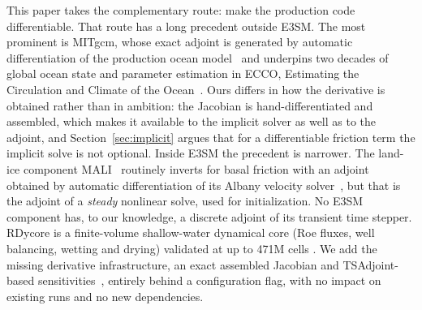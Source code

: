 \documentclass[11pt]{article}
\begin{document}
This paper takes the complementary route: make the production code
differentiable. That route has a long precedent outside E3SM. The most
prominent is MITgcm, whose exact adjoint is generated by automatic
differentiation of the production ocean model~\cite{heimbach2005mitgcm}
and underpins two decades of global ocean state and parameter
estimation in ECCO, Estimating the Circulation and Climate of the
Ocean~\cite{forget2015ecco}. Ours differs in how the derivative
is obtained rather than in ambition: the Jacobian is
hand-differentiated and assembled, which makes it available to the
implicit solver as well as to the adjoint, and
Section~\ref{sec:implicit} argues that for a differentiable friction
term the implicit solve is not optional. Inside E3SM the precedent is
narrower. The land-ice component MALI~\cite{hoffman2018mali} routinely
inverts for basal friction with an adjoint obtained by automatic
differentiation of its Albany velocity
solver~\cite{perego2014initialization}, but that is the adjoint of a
\emph{steady} nonlinear solve, used for initialization. No E3SM
component has, to our knowledge, a discrete adjoint of its transient
time stepper. RDycore is a finite-volume shallow-water dynamical core
(Roe fluxes, well balancing, wetting and drying) validated at up to
471M cells \cite{bisht2025development}. We add the missing
derivative infrastructure, an exact
assembled Jacobian and TSAdjoint-based
sensitivities~\cite{zhang2022tsadjoint}, entirely behind a
configuration flag, with no impact on existing runs and no new
dependencies.
\end{document}
